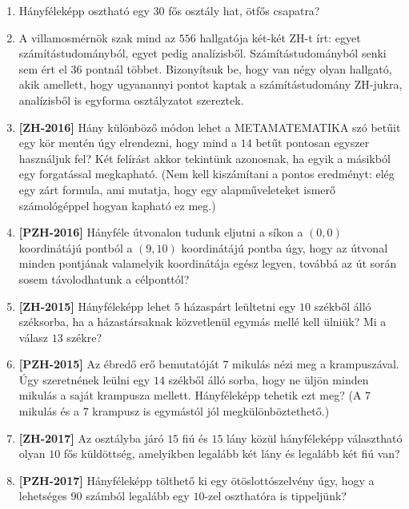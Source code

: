 \documentclass[a4paper,12pt]{article}
\begin{document}
\begin{enumerate}
        \item
        Hányféleképp osztható egy $30$ fős osztály hat, ötfős
        csapatra?

        \item
        A villamosmérnök szak mind az $556$ hallgatója két-két ZH-t írt: egyet
        számítástudományból, egyet pedig analízisből. Számítástudományból senki sem
        ért el $36$ pontnál többet. Bizonyítsuk be, hogy van négy olyan hallgató,
        akik amellett, hogy ugyanannyi pontot kaptak a számítástudomány ZH-jukra,
        analízisből is egyforma osztályzatot szereztek.

        \item \textbf{[ZH-2016]}
        Hány különböző módon lehet
        a METAMATEMATIKA szó betűit egy kör mentén úgy elrendezni, hogy mind a $14$
        betűt pontosan egyszer használjuk fel? Két felírást akkor tekintünk
        azonosnak, ha egyik a másikból egy forgatással megkapható.
        (Nem kell kiszámítani a pontos eredményt: elég egy zárt formula,
        ami mutatja, hogy egy alapműveleteket ismerő számológéppel hogyan
        kapható ez meg.)

        \item \textbf{[PZH-2016]} Hányféle útvonalon tudunk eljutni a síkon a $(0,0)$ koordinátájú pontból a $(9,10)$ koordinátájú pontba úgy, hogy az útvonal minden pontjának valamelyik koordinátája egész legyen, továbbá az út során sosem távolodhatunk a célponttól?

        \item \textbf{[ZH-2015]} Hányféleképp lehet $5$ házaspárt leültetni egy $10$ székből álló széksorba, ha a házastársaknak közvetlenül egymás mellé kell ülniük? Mi a válasz $13$ székre?

        \item \textbf{[PZH-2015]} Az ébredő erő bemutatóját $7$ mikulás nézi meg a krampuszával. Úgy szeretnének leülni egy $14$ székből álló sorba, hogy ne üljön minden mikulás a saját krampusza mellett. Hányféleképp tehetik ezt meg? (A $7$ mikulás és a $7$ krampusz is egymástól jól megkülönböztethető.)

        \item \textbf{[ZH-2017]} Az osztályba járó $15$ fiú és $15$ lány közül hányféleképp választható olyan $10$ fős küldöttség, amelyikben legalább két lány és legalább két fiú van?

        \item \textbf{[PZH-2017]} Hányféleképp tölthető ki egy ötöslottószelvény úgy, hogy a lehetséges $90$ számból legalább egy $10$-zel oszthatóra is tippeljünk?

    \end{enumerate}
\end{document}
